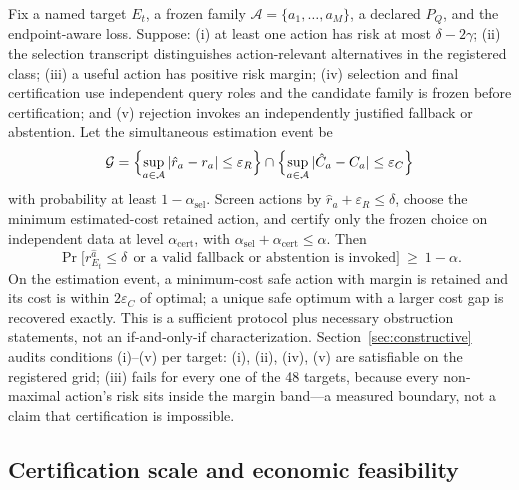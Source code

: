 \documentclass{article}
\renewcommand{\Pr}{\mathop{\mathrm{Pr}}}   %
\newcommand{\Acal}{\mathcal{A}}
\begin{document}
Fix a named target $E_t$, a frozen family $\Acal=\{a_1,\dots,a_M\}$, a declared $P_Q$, and the
endpoint-aware loss. Suppose: (i) at least one action has risk at most $\delta-2\gamma$; (ii) the selection
transcript distinguishes action-relevant alternatives in the registered class; (iii) a useful action has
positive risk margin; (iv) selection and final certification use independent query roles and the candidate
family is frozen before certification; and (v) rejection invokes an independently justified fallback or
abstention. Let the simultaneous estimation event be
\begin{equation}
\mathcal{G}
=\Bigl\{\sup_{a\in\Acal}|\hat r_{a}-r_{a}|\le\varepsilon_{R}\Bigr\}
\cap\Bigl\{\sup_{a\in\Acal}|\hat C_{a}-C_{a}|\le\varepsilon_{C}\Bigr\}
\label{eq:eventG}
\end{equation}
with probability at least $1-\alpha_{\mathrm{sel}}$. Screen actions by $\hat r_{a}+\varepsilon_{R}\le\delta$,
choose the minimum estimated-cost retained action, and certify only the frozen choice on independent data at
level $\alpha_{\mathrm{cert}}$, with $\alpha_{\mathrm{sel}}+\alpha_{\mathrm{cert}}\le\alpha$. Then
\begin{equation}
\Pr\bigl[r_{E_{t}}^{\hat a}\le\delta\ \ \text{or a valid fallback or abstention is invoked}\bigr]\ \ge\ 1-\alpha.
\label{eq:thm2}
\end{equation}
On the estimation event, a minimum-cost safe action with margin is retained and its cost is within
$2\varepsilon_{C}$ of optimal; a unique safe optimum with a larger cost gap is recovered exactly. This is a
sufficient protocol plus necessary obstruction statements, not an if-and-only-if characterization.
Section~\ref{sec:constructive} audits conditions (i)--(v) per target: (i), (ii), (iv), (v) are satisfiable
on the registered grid; (iii) fails for every one of the 48 targets, because every non-maximal action's risk
sits inside the margin band---a measured boundary, not a claim that certification is impossible.

\subsection{Certification scale and economic feasibility}
\end{document}
